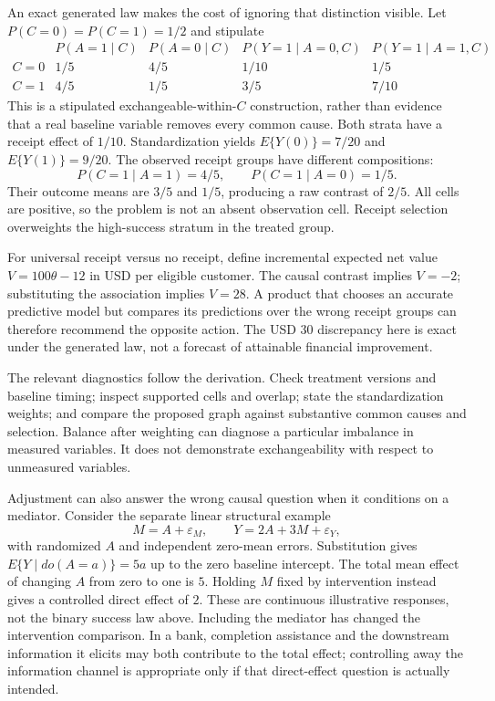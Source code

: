 An exact generated law makes the cost of ignoring that distinction visible.
Let $P(C=0)=P(C=1)=1/2$ and stipulate
\[
\begin{array}{c|cc|cc}
 &P(A=1\mid C)&P(A=0\mid C)
 &P(Y=1\mid A=0,C)&P(Y=1\mid A=1,C)\\ \hline
 C=0&1/5&4/5&1/10&1/5\\
 C=1&4/5&1/5&3/5&7/10
\end{array}
\]
This is a stipulated exchangeable-within-$C$ construction, rather than
evidence that a real baseline variable removes every common cause.
Both strata have a receipt effect of $1/10$. Standardization yields
$E\{Y(0)\}=7/20$ and $E\{Y(1)\}=9/20$.
The observed receipt groups have different compositions:
\[
 P(C=1\mid A=1)=4/5,\qquad P(C=1\mid A=0)=1/5.
\]
Their outcome means are $3/5$ and $1/5$, producing a raw contrast of
$2/5$. All cells are positive, so the problem is not an absent observation
cell. Receipt selection overweights the high-success stratum in the
treated group.~\citep{exec17_s3_exact}

For universal receipt versus no receipt, define incremental expected
net value $V=100\theta-12$ in USD per eligible customer. The causal contrast
implies $V=-2$; substituting the association implies $V=28$.
A product that chooses an accurate predictive model but compares its
predictions over the wrong receipt groups can therefore recommend the
opposite action. The USD 30 discrepancy here is exact under the generated
law, not a forecast of attainable financial improvement.

The relevant diagnostics follow the derivation. Check treatment versions
and baseline timing; inspect supported cells and overlap; state the
standardization weights; and compare the proposed graph against substantive
common causes and selection. Balance after weighting can diagnose a
particular imbalance in measured variables. It does not demonstrate
exchangeability with respect to unmeasured variables.

Adjustment can also answer the wrong causal question when it conditions
on a mediator. Consider the separate linear structural example
\[
 M=A+\varepsilon_M,\qquad
 Y=2A+3M+\varepsilon_Y,
\]
with randomized $A$ and independent zero-mean errors. Substitution gives
$E\{Y\mid do(A=a)\}=5a$ up to the zero baseline intercept. The total
mean effect of changing $A$ from zero to one is $5$. Holding $M$ fixed
by intervention instead gives a controlled direct effect of $2$.
These are continuous illustrative responses, not the binary success law
above. Including the mediator has changed the intervention comparison.
In a bank, completion assistance and the downstream information it
elicits may both contribute to the total effect; controlling away the
information channel is appropriate only if that direct-effect question
is actually intended.~\citep{exec17_s3_exact,pearl2009}


